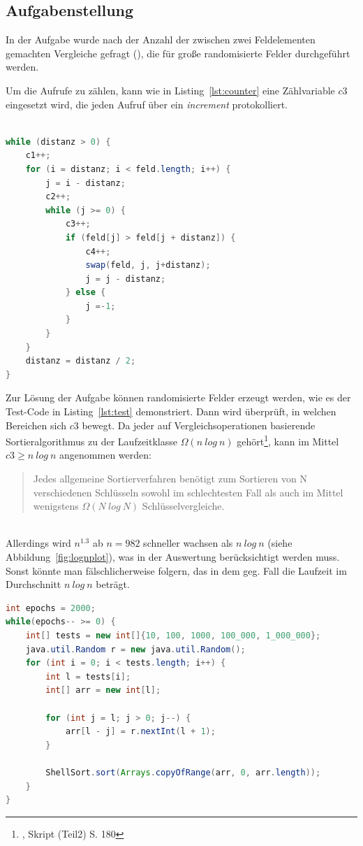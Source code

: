 \subsection*{Aufgabenstellung}
In der Aufgabe wurde nach der Anzahl der zwischen zwei Feldelementen gemachten Vergleiche gefragt (), die für große randomisierte Felder durchgeführt werden.

Um die Aufrufe zu zählen, kann wie in Listing~\ref{lst:counter} eine Zählvariable $c3$ eingesetzt wird, die jeden Aufruf über ein \textit{increment} protokolliert.

\begin{lstlisting}[language=java,caption={Zur Protokollierung der Aufrufe können in dem Code Zählvariablen eingesetzt werden ($c1, .. ,c4$).},label=lst:counter]

while (distanz > 0) {
    c1++;
    for (i = distanz; i < feld.length; i++) {
        j = i - distanz;
        c2++;
        while (j >= 0) {
            c3++;
            if (feld[j] > feld[j + distanz]) {
                c4++;
                swap(feld, j, j+distanz);
                j = j - distanz;
            } else {
                j =-1;
            }
        }
    }
    distanz = distanz / 2;
}

\end{lstlisting}

Zur Lösung der Aufgabe können randomisierte Felder erzeugt werden, wie es der Test-Code in Listing~\ref{lst:test} demonstriert. Dann wird überprüft, in welchen Bereichen sich $c3$ bewegt.
Da jeder auf Vergleichsoperationen basierende Sortieralgorithmus zu der Laufzeitklasse $\Omega(n\ log\ n)$ gehört\footnote{\cite[154]{OW17b}, Skript (Teil2) S. 180}, kann im Mittel $c3 \geq n\ log\ n$ angenommen werden:

\blockquote[{\cite[154, Satz 2.4]{OW17b}}]{
Jedes allgemeine Sortierverfahren benötigt zum Sortieren von N verschiedenen Schlüsseln sowohl im schlechtesten Fall als auch im Mittel wenigstens $\Omega(N\ log\ N)$
Schlüsselvergleiche.
}\\

Allerdings wird $n^{1.3}$ ab $n=982$ schneller wachsen als $n\ log\ n$ (siehe Abbildung~\ref{fig:lognplot}),  was in der Auswertung berücksichtigt werden muss. Sonst könnte man fälschlicherweise folgern, das in dem geg. Fall die Laufzeit im Durchschnitt $n\ log\ n$ beträgt.
\newpage
\begin{lstlisting}[language=java,caption={Code zum Erzeugen randomisierter Felder zum Testen von Shellsort.},label=lst:test]
int epochs = 2000;
while(epochs-- >= 0) {
    int[] tests = new int[]{10, 100, 1000, 100_000, 1_000_000};
    java.util.Random r = new java.util.Random();
    for (int i = 0; i < tests.length; i++) {
        int l = tests[i];
        int[] arr = new int[l];

        for (int j = l; j > 0; j--) {
            arr[l - j] = r.nextInt(l + 1);
        }

        ShellSort.sort(Arrays.copyOfRange(arr, 0, arr.length));
    }
}
\end{lstlisting}

